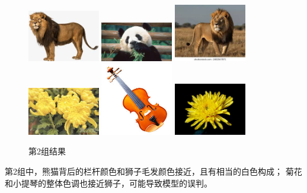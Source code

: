 \documentclass{article}
\begin{document}
\begin{figure}[h]
\centering
\includegraphics[width=0.28\textwidth]{./CNN/target/2lion}
\includegraphics[width=0.28\textwidth]{./CNN/dataset/5}
\includegraphics[width=0.28\textwidth]{./CNN/dataset/13}
\includegraphics[width=0.28\textwidth]{./CNN/dataset/35}
\includegraphics[width=0.28\textwidth]{./CNN/dataset/50}
\includegraphics[width=0.28\textwidth]{./CNN/dataset/33}
\caption{第2组结果}
\end{figure}

    第2组中，熊猫背后的栏杆颜色和狮子毛发颜色接近，且有相当的白色构成；
    菊花和小提琴的整体色调也接近狮子，可能导致模型的误判。
\end{document}

